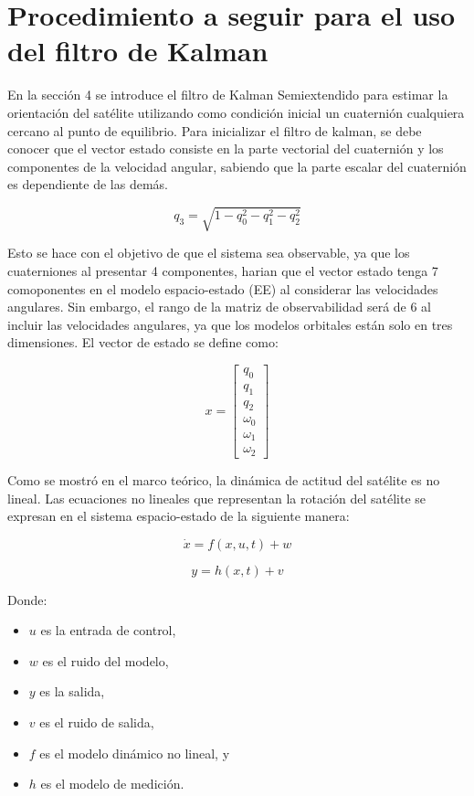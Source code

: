\section{Procedimiento a seguir para el uso del filtro de Kalman}

\label{ap:Z4}

En la sección 4 se introduce el filtro de Kalman Semiextendido para estimar la orientación del satélite utilizando como condición inicial un cuaternión cualquiera cercano al punto de equilibrio. Para inicializar el filtro de kalman, se debe conocer que el vector estado consiste en la parte vectorial del cuaternión y los componentes de la velocidad angular, sabiendo que la parte escalar del cuaternión es dependiente de las demás.

\[
q_3 = \sqrt{1 - q_0^2 - q_1^2 - q_2^2}
\]

Esto se hace con el objetivo de que el sistema sea observable, ya que los cuaterniones al presentar 4 componentes, harian que el vector estado tenga 7 comoponentes en el modelo espacio-estado (EE) al considerar las velocidades angulares. Sin embargo, el rango de la matriz de observabilidad será de 6 al incluir las velocidades angulares, ya que los modelos orbitales están solo en tres dimensiones. El vector de estado se define como:

\[
x = \begin{bmatrix} q_0 \\ q_1 \\ q_2 \\ \omega_0 \\ \omega_1 \\ \omega_2 \end{bmatrix}
\]

Como se mostró en el marco teórico, la dinámica de actitud del satélite es no lineal. Las ecuaciones no lineales que representan la rotación del satélite se expresan en el sistema espacio-estado de la siguiente manera:

\[
\dot{x} = f(x, u, t) + w
\]

\[
y = h(x, t) + v
\]

Donde:
\begin{itemize}
	\item $u$ es la entrada de control,
	\item $w$ es el ruido del modelo,
	\item $y$ es la salida,
	\item $v$ es el ruido de salida,
	\item $f$ es el modelo dinámico no lineal, y
	\item $h$ es el modelo de medición.
\end{itemize}

